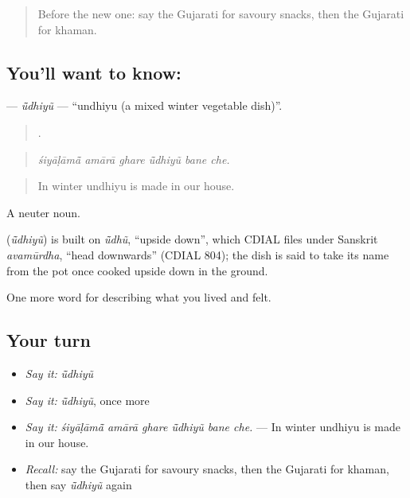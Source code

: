 \label{lesson:GU-C523-udhiyu}



\begin{quote}
Before the new one: say the Gujarati for savoury snacks, then the Gujarati for khaman.
\end{quote}

\subsection*{You'll want to know: }
\textbf{} — \emph{ū̃dhiyũ} — \textquotedblleft{}undhiyu (a mixed winter vegetable dish)\textquotedblright{}.

\begin{quote}
     .
\end{quote}

\begin{quote}
\emph{śiyāḷāmā̃ amārā ghare ū̃dhiyũ bane che.}
\end{quote}

\begin{quote}
In winter undhiyu is made in our house.
\end{quote}

A neuter noun.

\begin{cousinweb}
\textbf{} (\emph{ū̃dhiyũ}) is built on \emph{ū̃dhũ}, \textquotedblleft{}upside down\textquotedblright{}, which CDIAL files under Sanskrit \emph{avamūrdha}, \textquotedblleft{}head downwards\textquotedblright{} (CDIAL 804); the dish is said to take its name from the pot once cooked upside down in the ground.
\end{cousinweb}

\begin{grammarlens}[title={What you've built}]
One more word for describing what you lived and felt.
\end{grammarlens}

\subsection*{Your turn}
\begin{itemize}
\raggedright
  \item \emph{Say it:} \emph{ū̃dhiyũ}
  \item \emph{Say it:} \emph{ū̃dhiyũ}, once more
  \item \emph{Say it:} \emph{śiyāḷāmā̃ amārā ghare ū̃dhiyũ bane che.} — In winter undhiyu is made in our house.
  \item \emph{Recall:} say the Gujarati for savoury snacks, then the Gujarati for khaman, then say \emph{ū̃dhiyũ} again
\end{itemize}

